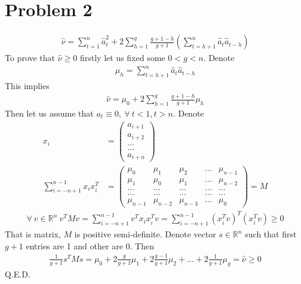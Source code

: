 \documentclass[a4paper]{article}
\begin{document}
\section*{Problem 2}
\begin{align*}
\hat{\nu} = \sum_{t=1}^n \hat{a}_t^2 + 2 \sum_{h=1}^g \frac{g+1-h}{g+1} \left(\sum_{t = h+1}^n \hat{a}_{t}\hat{a}_{t-h}\right)
\end{align*}
To prove that $\hat{\nu} \ge 0$ firstly let us fixed some $0<g<n$. Denote 
\begin{align*}
\mu_h = \sum_{t = h+1}^n\hat{a}_t \hat{a}_{t-h}
\end{align*}
This implies
\begin{align*}
\hat{\nu} = \mu_0 + 2\sum_{h=1}^g \frac{g+1-h}{g+1}\mu_h
\end{align*}
Then let us assume that $a_t \equiv 0,\ \forall\ t < 1, t > n$. Denote
\begin{align*}
x_i &= \begin{pmatrix}
a_{i+1}\\
a_{i+2}\\
\dots\\
\dots\\
a_{i+n}
\end{pmatrix}\\
\sum_{i = -n + 1}^{n-1} x_i x_i^T &= \begin{pmatrix}
\mu_0 & \mu_1 & \mu_2 & \dots & \mu_{n-1}\\
\mu_1 & \mu_0 & \mu_1 & \dots & \mu_{n-2}\\
\dots & \dots & \dots & \dots & \dots \\
\dots & \dots & \dots & \dots & \dots \\
\mu_{n-1} & \mu_{n-2} & \mu_{n-3} & \dots & \mu_0
\end{pmatrix} = M
\end{align*} 
\begin{align*}
\forall\ v \in \mathbb{R}^{n}\ v^TMv = \sum_{i=-n+1}^{n-1} v^Tx_ix_i^Tv = \sum_{i=-n+1}^{n-1} (x_i^Tv)^T(x_i^Tv) \ge 0
\end{align*}
That is matrix, $M$ is positive semi-definite. Denote vector $s \in \mathbb{R}^n$ such that first $g+1$ entries are 1 and other are 0. Then
\begin{align*}
\frac{1}{g+1}s^TMs = \mu_0 + 2\frac{g}{g+1}\mu_1 + 2\frac{g-1}{g+1}\mu_2 + \dots + 2 \frac{1}{g+1}\mu_g = \hat{\nu} \ge 0
\end{align*}
Q.E.D.
\end{document}
